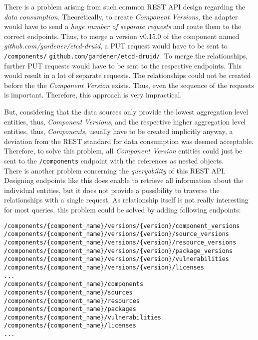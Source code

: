 There is a problem arising from such common REST API design regarding the \emph{data consumption}. Theoretically, to create \emph{Component Versions}, the adapter would have to send a \emph{huge number of separate requests} and route them to the correct endpoints. Thus, to merge a version v0.15.0 of the component named \emph{github.com/gardener/etcd-druid}, a PUT request would have to be sent to \lstinline|/components/| \lstinline|github.com/gardener/etcd-druid/|. To merge the relationships, further PUT requests would have to be sent to the respective endpoints. This would result in a lot of separate requests. The relationships could not be created before the the \emph{Component Version} exists. Thus, even the sequence of the requests is important. Therefore, this approach is very impractical.\par
But, considering that the data sources only provide the lowest aggregation level entities, thus, \emph{Component Versions}, and the respective higher aggregation level entities, thus, \emph{Components}, usually have to be created implicitly anyway, a deviation from the REST standard for data consumption was deemed acceptable. Therefore, to solve this problem, all \emph{Component Version} entities could just be sent to the \lstinline|/components| endpoint with the references as nested objects.\\

There is another problem concerning the \emph{queryability} of this REST API. Designing endpoints like this does enable to retrieve all information about the individual entities, but it does not provide a possibility to traverse the relationships with a single request. As relationship itself is not really interesting for most queries, this problem could be solved by adding following endpoints:

\begin{lstlisting}[basicstyle=\tiny, caption=REST API Query Endpoints, captionpos=b, label=lst:RESTAPIQueryEndpoints]
/components/{component_name}/versions/{version}/component_versions
/components/{component_name}/versions/{version}/source_versions
/components/{component_name}/versions/{version}/resource_versions
/components/{component_name}/versions/{version}/package_versions
/components/{component_name}/versions/{version}/vulnerabilities
/components/{component_name}/versions/{version}/licenses
...
/components/{component_name}/components
/components/{component_name}/sources
/components/{component_name}/resources
/components/{component_name}/packages
/components/{component_name}/vulnerabilities
/components/{component_name}/licenses
...
\end{lstlisting}

